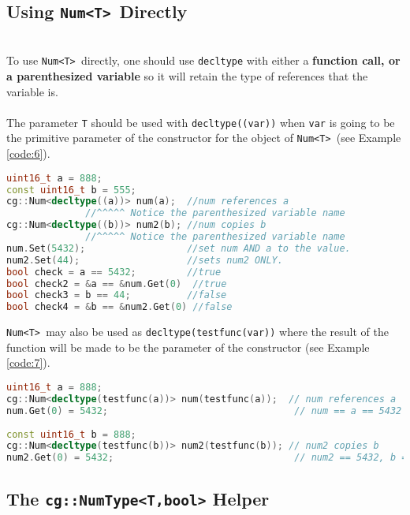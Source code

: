 \documentclass{article}
\newcommand{\theobj}{\protect\Verb+Num<T> +}
\begin{document}
\subsection{Using \theobj Directly}
\hfill \\ \indent
To use \theobj directly, one should use \Verb+decltype+ with either a \textbf{function call, or a parenthesized variable} so it will retain the type of references that the variable is. 
\hfill \\ \hfill \\ 
\indent
The parameter \Verb+T+ should be used with \Verb+decltype((var))+ when \Verb+var+ is going to be the primitive parameter of the constructor for the object of \theobj (see Example \vref{code:6}).
\pagebreak
\begin{lstlisting}[language=C++, label=code:6, caption=Construct a \theobj with a varaible]
uint16_t a = 888;
const uint16_t b = 555;
cg::Num<decltype((a))> num(a);  //num references a
              //^^^^^ Notice the parenthesized variable name
cg::Num<decltype((b))> num2(b); //num copies b
              //^^^^^ Notice the parenthesized variable name
num.Set(5432);                  //set num AND a to the value.
num2.Set(44);                   //sets num2 ONLY.
bool check = a == 5432;         //true
bool check2 = &a == &num.Get(0)  //true
bool check3 = b == 44;          //false
bool check4 = &b == &num2.Get(0) //false
\end{lstlisting}
 \theobj may also be used as \Verb+decltype(testfunc(var))+ where the result of the function will be made to be the parameter of the constructor (see Example \vref{code:7}).
\begin{lstlisting}[language=C++, label=code:7, caption=\theobj and function decyltype]
uint16_t a = 888;                                 
cg::Num<decltype(testfunc(a))> num(testfunc(a));  // num references a
num.Get(0) = 5432;                                 // num == a == 5432
                                                  
const uint16_t b = 888;                           
cg::Num<decltype(testfunc(b))> num2(testfunc(b)); // num2 copies b
num2.Get(0) = 5432;                                // num2 == 5432, b == 888
\end{lstlisting}

\subsection{The \protect\Verb+cg::NumType<T,bool>+ Helper}
\end{document}
